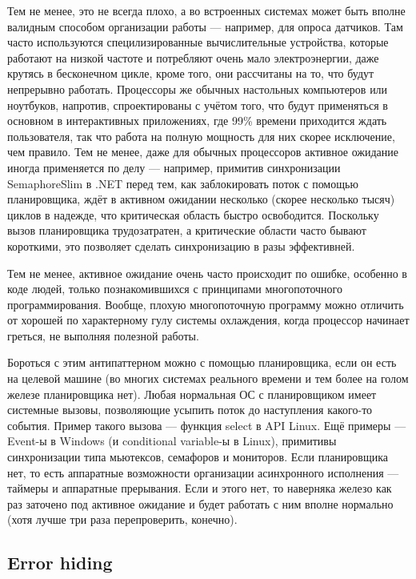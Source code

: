 \documentclass{../../text-style}
\begin{document}
Тем не менее, это не всегда плохо, а во встроенных системах может быть вполне валидным способом организации работы --- например, для опроса датчиков. Там часто используются специлизированные вычислительные устройства, которые работают на низкой частоте и потребляют очень мало электроэнергии, даже крутясь в бесконечном цикле, кроме того, они рассчитаны на то, что будут непрерывно работать. Процессоры же обычных настольных компьютеров или ноутбуков, напротив, спроектированы с учётом того, что будут применяться в основном в интерактивных приложениях, где 99\% времени приходится ждать пользователя, так что работа на полную мощность для них скорее исключение, чем правило. Тем не менее, даже для обычных процессоров активное ожидание иногда применяется по делу --- например, примитив синхронизации SemaphoreSlim в .NET перед тем, как заблокировать поток с помощью планировщика, ждёт в активном ожидании несколько (скорее несколько тысяч) циклов в надежде, что критическая область быстро освободится. Поскольку вызов планировщика трудозатратен, а критические области часто бывают короткими, это позволяет сделать синхронизацию в разы эффективней.

Тем не менее, активное ожидание очень часто происходит по ошибке, особенно в коде людей, только познакомившихся с принципами многопоточного программирования. Вообще, плохую многопоточную программу можно отличить от хорошей по характерному гулу системы охлаждения, когда процессор начинает греться, не выполняя полезной работы.

Бороться с этим антипаттерном можно с помощью планировщика, если он есть на целевой машине (во многих системах реального времени и тем более на голом железе планировщика нет). Любая нормальная ОС с планировщиком имеет системные вызовы, позволяющие усыпить поток до наступления какого-то события. Пример такого вызова --- функция select в API Linux. Ещё примеры --- Event-ы в Windows (и conditional variable-ы в Linux), примитивы синхронизации типа мьютексов, семафоров и мониторов. Если планировщика нет, то есть аппаратные возможности организации асинхронного исполнения --- таймеры и аппаратные прерывания. Если и этого нет, то наверняка железо как раз заточено под активное ожидание и будет работать с ним вполне нормально (хотя лучше три раза перепроверить, конечно).

\subsection{Error hiding}
\end{document}
